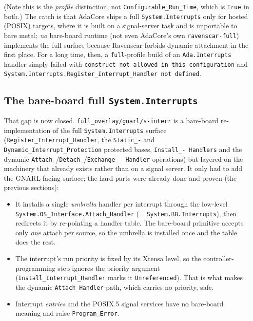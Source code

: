 (Note this is the \emph{profile} distinction, not \texttt{Configurable\_Run\_Time},
which is \texttt{True} in both.) The catch is that AdaCore ships a full
\texttt{System.Interrupts} only for hosted (POSIX) targets, where it is built on
a signal-server task and is unportable to bare metal; \emph{no} bare-board
runtime (not even AdaCore's own \texttt{ravenscar-full}) implements the
full surface because Ravenscar forbids dynamic attachment in the first place.
For a long time, then, a \texttt{full}-profile build of an \texttt{Ada.Interrupts}
handler simply failed with \texttt{construct not allowed in this configuration}
and \texttt{System.Interrupts.Register\_Interrupt\_Handler not defined}.

\subsection{The bare-board full \texttt{System.Interrupts}}

That gap is now closed. \texttt{full\_overlay/gnarl/s-interr}
is a bare-board re-implementation of the full \texttt{System.Interrupts}
surface (\texttt{Register\_Interrupt\_Handler}, the \texttt{Static\_-} and
\texttt{Dynamic\_Interrupt\_Protection} protected bases, \texttt{Install\_-
Handlers} and the dynamic \texttt{Attach\_}/\texttt{Detach\_}/\texttt{Exchange\_-
Handler} operations) but layered on the machinery that already exists rather
than on a signal server. It only had to add the GNARL-facing surface; the hard
parts were already done and proven (the previous sections):

\begin{itemize}
  \item It installs a single \emph{umbrella} handler per interrupt through the
        low-level \texttt{System.OS\_Interface.Attach\_Handler}
        (= \texttt{System.BB.Interrupts}), then redirects it by re-pointing a
        handler table. The bare-board primitive accepts only \emph{one} attach
        per source, so the umbrella is installed once and the table does the rest.
  \item The interrupt's run priority is fixed by its Xtensa level, so the
        controller-programming step ignores the priority argument
        (\texttt{Install\_Interrupt\_Handler} marks it \texttt{Unreferenced}).
        That is what makes the dynamic \texttt{Attach\_Handler} path, which
        carries no priority, safe.
  \item Interrupt \emph{entries} and the POSIX.5 signal services have no
        bare-board meaning and raise \texttt{Program\_Error}.
\end{itemize}

